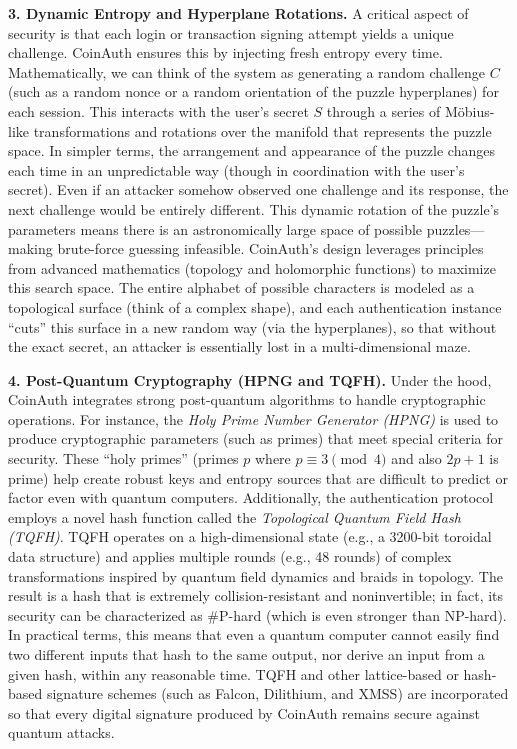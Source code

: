 \documentclass[10pt,letterpaper]{article}
\begin{document}
\noindent \textbf{3. Dynamic Entropy and Hyperplane Rotations.} A critical aspect of security is that each login or transaction signing attempt yields a unique challenge. CoinAuth ensures this by injecting fresh entropy every time. Mathematically, we can think of the system as generating a random challenge \( C \) (such as a random nonce or a random orientation of the puzzle hyperplanes) for each session. This interacts with the user’s secret \( S \) through a series of Möbius-like transformations and rotations over the manifold that represents the puzzle space. In simpler terms, the arrangement and appearance of the puzzle changes each time in an unpredictable way (though in coordination with the user’s secret). Even if an attacker somehow observed one challenge and its response, the next challenge would be entirely different. This dynamic rotation of the puzzle’s parameters means there is an astronomically large space of possible puzzles---making brute-force guessing infeasible. CoinAuth’s design leverages principles from advanced mathematics (topology and holomorphic functions) to maximize this search space. The entire alphabet of possible characters is modeled as a topological surface (think of a complex shape), and each authentication instance “cuts” this surface in a new random way (via the hyperplanes), so that without the exact secret, an attacker is essentially lost in a multi-dimensional maze.

\noindent \textbf{4. Post-Quantum Cryptography (HPNG and TQFH).} Under the hood, CoinAuth integrates strong post-quantum algorithms to handle cryptographic operations. For instance, the \emph{Holy Prime Number Generator (HPNG)} is used to produce cryptographic parameters (such as primes) that meet special criteria for security. These “holy primes” (primes \( p \) where \( p \equiv 3 \pmod{4} \) and also \( 2p+1 \) is prime) help create robust keys and entropy sources that are difficult to predict or factor even with quantum computers. Additionally, the authentication protocol employs a novel hash function called the \emph{Topological Quantum Field Hash (TQFH)}. TQFH operates on a high-dimensional state (e.g., a 3200-bit toroidal data structure) and applies multiple rounds (e.g., 48 rounds) of complex transformations inspired by quantum field dynamics and braids in topology. The result is a hash that is extremely collision-resistant and noninvertible; in fact, its security can be characterized as \#P-hard (which is even stronger than NP-hard). In practical terms, this means that even a quantum computer cannot easily find two different inputs that hash to the same output, nor derive an input from a given hash, within any reasonable time. TQFH and other lattice-based or hash-based signature schemes (such as Falcon, Dilithium, and XMSS) are incorporated so that every digital signature produced by CoinAuth remains secure against quantum attacks.
\end{document}
